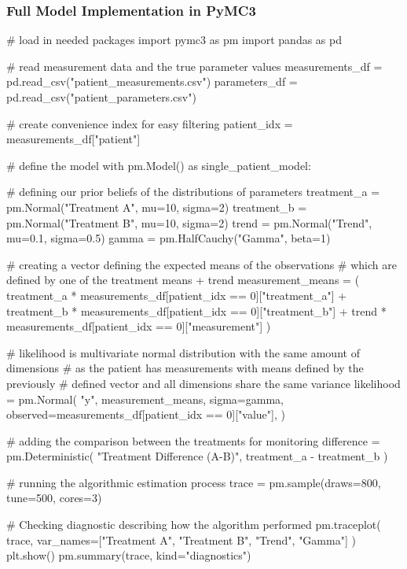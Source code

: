\documentclass[12pt,a4paper,leqno]{report}
\theoremstyle{plain}
\theoremstyle{definition}
\theoremstyle{remark}
\begin{document}
\pagebreak

\subsubsection*{Full Model Implementation in PyMC3}
\bigskip
\begin{pyverbatim}[][fontsize=\footnotesize]
# load in needed packages
import pymc3 as pm
import pandas as pd

# read measurement data and the true parameter values
measurements_df = pd.read_csv("patient_measurements.csv")
parameters_df = pd.read_csv("patient_parameters.csv")

# create convenience index for easy filtering
patient_idx = measurements_df["patient"]
   
# define the model
with pm.Model() as single_patient_model:

    # defining our prior beliefs of the distributions of parameters
    treatment_a = pm.Normal("Treatment A", mu=10, sigma=2)
    treatment_b = pm.Normal("Treatment B", mu=10, sigma=2)
    trend = pm.Normal("Trend", mu=0.1, sigma=0.5)
    gamma = pm.HalfCauchy("Gamma", beta=1)

    # creating a vector defining the expected means of the observations
    # which are defined by one of the treatment means + trend
    measurement_means = (
        treatment_a * measurements_df[patient_idx == 0]["treatment_a"]
        + treatment_b * measurements_df[patient_idx == 0]["treatment_b"]
        + trend * measurements_df[patient_idx == 0]["measurement"]
    )

    # likelihood is multivariate normal distribution with the same amount of dimensions
    # as the patient has measurements with means defined by the previously
    # defined vector and all dimensions share the same variance
    likelihood = pm.Normal(
        "y",
        measurement_means,
        sigma=gamma,
        observed=measurements_df[patient_idx == 0]["value"],
    )

    # adding the comparison between the treatments for monitoring
    difference = pm.Deterministic(
        "Treatment Difference (A-B)", treatment_a - treatment_b
    )

    # running the algorithmic estimation process
    trace = pm.sample(draws=800, tune=500, cores=3)

    # Checking diagnostic describing how the algorithm performed
    pm.traceplot(
        trace, var_names=["Treatment A", "Treatment B", "Trend", "Gamma"]
    )
    plt.show()
    pm.summary(trace, kind="diagnostics")


\end{pyverbatim}
\end{document}
